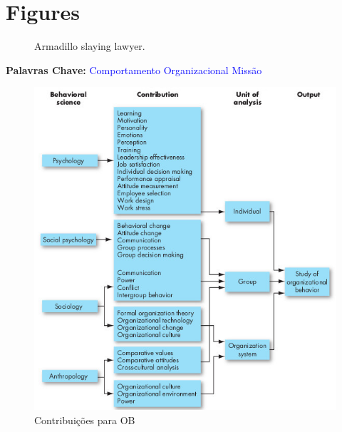 \section*{Figures}
\begin{figure}[H]
	\caption{Armadillo slaying lawyer.}
	\label{arm:fig1}
\end{figure}
\begin{figure}[H]
\end{figure}
\textbf{Palavras Chave:} \textcolor{blue}{Comportamento Organizacional} \textcolor{blue}{Missão}
\begin{figure}[H]
	\centering
	\includegraphics[scale=0.52]{./image/CORGA/OB/OB_contributions.jpg}
	\caption{Contribuições para OB \cite{book_2}}
\end{figure}

